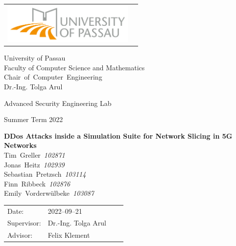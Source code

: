 \documentclass[fontsize=10pt,openright,oneside,paper=a4,BCOR=1cm,numbers=noenddot]{scrbook}
\newcommand{\authornamefirstone}{Tim}
\newcommand{\authornamelastone}{Greller}
\newcommand{\matrikelnummerone}{102871}
\newcommand{\authornamefirsttwo}{Jonas}
\newcommand{\authornamelasttwo}{Heitz}
\newcommand{\matrikelnummertwo}{102939}
\newcommand{\authornamefirstthree}{Sebastian}
\newcommand{\authornamelastthree}{Pretzsch}
\newcommand{\matrikelnummerthree}{103114}
\newcommand{\authornamefirstfour}{Finn}
\newcommand{\authornamelastfour}{Ribbeck}
\newcommand{\matrikelnummerfour}{102876}
\newcommand{\authornamefirstfive}{Emily}
\newcommand{\authornamelastfive}{Vorderwülbeke}
\newcommand{\matrikelnummerfive}{103087}
\newcommand{\worktitle}{DDos Attacks inside a Simulation Suite for Network Slicing in 5G Networks}
\newcommand{\thesistype}{Advanced Security Engineering Lab}
\newcommand{\courseofstudies}{Summer Term 2022}
\newcommand{\thesisdate}{2022--09--21}   %
\newcommand{\thesisprof}{Dr.-Ing. Tolga Arul}
\newcommand{\chair}{\mbox{Chair of Computer Engineering}}
\newcommand{\advisor}{Felix Klement}
\begin{document}
\frontmatter
\thispagestyle{empty}
\newpage

\vspace{1cm}

\begin{center}
\begin{tabular}{lr}
\includegraphics[width=6.5cm]{img/logouni_en.png}
\end{tabular}

\vspace{3cm}
\Large University of Passau
\\
\Large Faculty of Computer Science and Mathematics
\\
\vspace{0.3cm}
\Large {\chair }
\\
\Large \thesisprof

\end{center}


\vspace{2.5cm}

\begin{center}
        {\Large \thesistype 
        
        \courseofstudies} 
\end{center}

\begin{center}
        \settowidth{\baselineskip}{0.4cm}
        {\LARGE \textbf{\worktitle}}
        \\
        {\Large
        \vspace{1cm}
        \authornamefirstone~\authornamelastone~\textit{\matrikelnummerone} \\
        \authornamefirsttwo~\authornamelasttwo~\textit{\matrikelnummertwo} \\
        \authornamefirstthree~\authornamelastthree~\textit{\matrikelnummerthree} \\
        \authornamefirstfour~\authornamelastfour~\textit{\matrikelnummerfour} \\
        \authornamefirstfive~\authornamelastfive~\textit{\matrikelnummerfive} \\
        }
\end{center}

\vfill {%

\vfill


{\large
\begin{tabular}[l]{llll}

Date:       & \thesisdate %
\smallskip \\
Supervisor:   & \thesisprof \\
Advisor: & \advisor \\
\end{tabular}}
} \cleardoublepage
\end{document}

